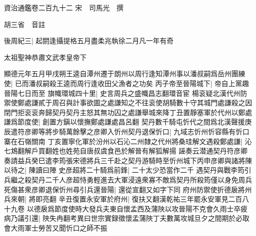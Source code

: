 資治通鑑卷二百九十二
宋　司馬光　撰

胡三省　音註

後周紀三|{
	起閼逢攝提格五月盡柔兆執徐二月凡一年有奇}


太祖聖神恭肅文武孝皇帝下

顯德元年五月甲戌朔王逵自潭州遷于朗州以周行逢知潭州事以潘叔嗣爲岳州團練使|{
	已而潘叔嗣殺王逵而周行逢收田父漁者之功矣}
丙子帝至晉陽城下|{
	帝自上黨趣晉陽七日而至}
旗幟環城四十里|{
	史言周兵之盛幟昌志翻環音宦}
楊衮疑北漢代州防禦使鄭處謙貳于周召與計事欲圖之處謙知之不往衮使胡騎數十守其城門處謙殺之因閉門拒衮衮奔歸契丹契丹主怒其無功囚之處謙舉城來降丁丑置靜塞軍於代州以鄭處謙爲節度使|{
	創置方鎭以懷撫鄭處謙處昌呂翻}
契丹數千騎屯忻代之間爲北漢聲援庚辰遣符彦卿等將步騎萬餘擊之彦卿入忻州契丹退保忻口|{
	九域志忻州忻容縣有忻口寨在石嶺關南}
丁亥置寧化軍於汾州以石沁二州隸之代州將桑珪解文遇殺鄭處謙|{
	沁七鴆翻解戶買翻姓也姓苑自唐叔虞食邑於解晉有解狐解揚}
誣奏云潜通契丹符彦卿奏請益兵癸巳遣李筠張宋德將兵三千赴之契丹游騎時至忻州城下丙申彦卿與諸將陳以待之|{
	陳讀曰陣}
史彦超將二十騎爲前鋒|{
	二十太少恐當作二千}
遇契丹與戰李筠引兵繼之殺契丹二千人彦超恃勇輕進去大軍浸遠衆寡不敵爲契丹所殺筠僅以身免周兵死傷甚衆彦卿退保忻州尋引兵還晉陽|{
	還從宣翻又如字下同}
府州防禦使折德扆將州兵來朝|{
	將即亮翻}
辛丑復置永安軍於府州|{
	復扶又翻漢乾祐三年罷永安軍見二百八十九卷}
以德扆爲節度使時大發兵夫東自懷孟西及蒲陜以攻晉陽不克會久雨士卒疲病乃議引還|{
	陜失冉翻考異曰世宗實録徵懷孟蒲陜丁夫數萬攻城旦夕之間期於必取會大雨軍士勞苦又聞忻口之師不振}


